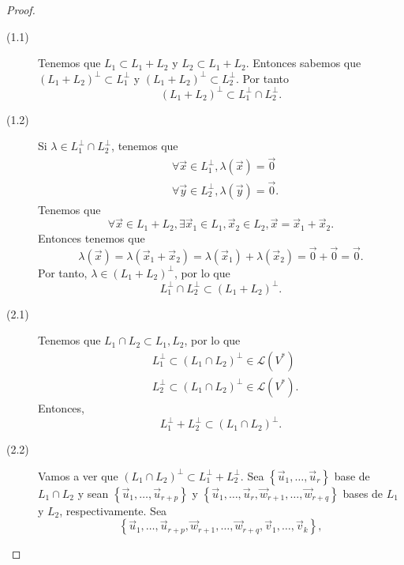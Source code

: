 \begin{proof}
\begin{description}
\item[(1.1)]  Tenemos que $\displaystyle L_{1} \subset L_{1} + L_{2} $ y $\displaystyle L_{2} \subset L_{1}+L_{2} $. Entonces sabemos que $\displaystyle \left(L_{1}+L_{2}\right)^{\perp} \subset L_{1}^{\perp} $ y $\displaystyle \left(L_{1}+L_{2}\right)^{\perp}\subset L_{2}^{\perp} $. Por tanto
\[\left(L_{1}+L_{2}\right)^{\perp} \subset L_{1}^{\perp} \cap L_{2}^{\perp} .\]
\item[(1.2)] Si $\displaystyle \lambda \in L_{1}^{\perp} \cap L_{2}^{\perp} $, tenemos que 
\[
\begin{split}
&  \forall \vec{x} \in L_{1}^{\perp}, \lambda\left(\vec{x}\right) = \vec{0} \\
& \forall \vec{y} \in L_{2}^{\perp}, \lambda\left(\vec{y}\right) = \vec{0}.
\end{split}
\]
Tenemos que 
\[\forall\vec{x} \in L_{1}+L_{2}, \exists\vec{x}_{1}\in L_{1}, \vec{x}_{2} \in L_{2}, \vec{x} = \vec{x}_{1} +\vec{x}_{2} .\]
Entonces tenemos que 
\[\lambda\left(\vec{x}\right) = \lambda\left(\vec{x}_{1}+\vec{x}_{2}\right) = \lambda\left(\vec{x}_{1}\right)+\lambda\left(\vec{x}_{2}\right) = \vec{0} + \vec{0} = \vec{0} .\]
Por tanto, $\displaystyle \lambda \in \left(L_{1}+L_{2}\right)^{\perp} $, por lo que 
\[L_{1}^{\perp} \cap L_{2}^{\perp} \subset \left(L_{1}+L_{2}\right)^{\perp} .\]
\item[(2.1)] Tenemos que $\displaystyle L_{1}\cap L_{2} \subset L_{1}, L_{2} $, por lo que 
	\[
	\begin{split}
	& L_{1}^{\perp}\subset \left(L_{1}\cap L_{2}\right)^{\perp} \in \mathcal{L}\left(V^{*}\right) \\
	& L_{2}^{\perp} \subset \left(L_{1}\cap L_{2}\right)^{\perp} \in \mathcal{L}\left(V^{*}\right).
	\end{split}
	\]
Entonces, 
\[L_{1}^{\perp} + L_{2}^{\perp} \subset \left(L_{1} \cap L_{2}\right)^{\perp} .\]
\item[(2.2)] Vamos a ver que $\displaystyle \left(L_{1}\cap L_{2}\right)^{\perp} \subset L_{1}^{\perp} + L_{2}^{\perp} $. Sea $\displaystyle \left\{ \vec{u}_{1}, \ldots, \vec{u}_{r}\right\}  $ base de $\displaystyle L_{1}\cap L_{2} $ y sean $\displaystyle \left\{ \vec{u}_{1}, \ldots, \vec{u}_{r+p}\right\}  $ y $\displaystyle \left\{ \vec{u}_{1}, \ldots, \vec{u}_{r}, \vec{w}_{r+1}, \ldots, \vec{w}_{r+q}\right\}  $ bases de $\displaystyle L_{1} $ y $\displaystyle L_{2} $, respectivamente. Sea 
	\[  \left\{ \vec{u}_{1}, \ldots, \vec{u}_{r+p}, \vec{w}_{r+1}, \ldots, \vec{w}_{r+q}, \vec{v}_{1}, \ldots, \vec{v}_{k}\right\}, \]

\end{description}
\end{proof}
